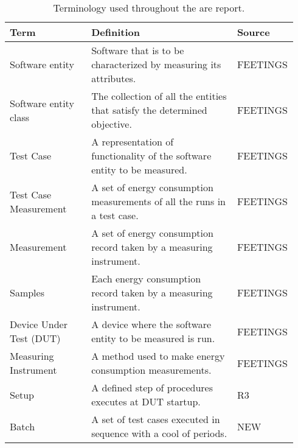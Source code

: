 
\begin{table}[ht]
    \begin{tabular}{| p{0.29\linewidth} | p{0.5\linewidth}| p{0.15\linewidth}|}
        \hline
        \textbf{Term}           & \textbf{Definition}                                                       & \textbf{Source} \\ \hline
        Software entity         & Software that is to be characterized by measuring its attributes.         & FEETINGS\cite{MANCEBO2021100558}        \\ \hline
        Software entity class   & The collection of all the entities that satisfy the determined objective. & FEETINGS        \\ \hline
        Test Case               & A representation of functionality of the software entity to be measured.  & FEETINGS        \\ \hline
        Test Case Measurement    & A set of energy consumption measurements of all the runs in a test case.  & FEETINGS        \\ \hline
        Measurement             & A set of energy consumption record taken by a measuring instrument.       & FEETINGS        \\ \hline
        Samples                 & Each energy consumption record taken by a measuring instrument.           & FEETINGS        \\ \hline
        Device Under Test (DUT) & A device where the software entity to be measured is run.                 & FEETINGS        \\ \hline
        Measuring Instrument    & A method used to make energy consumption measurements.                    & FEETINGS        \\ \hline
        Setup                   & A defined step of procedures executes at DUT startup.                     & R3\cite{Bokhari2020r3}              \\ \hline
        Batch                   & A set of test cases executed in sequence with a cool of periods.            & NEW             \\ \hline
    
    \end{tabular}
    \caption{Terminology used throughout the are report.}
    \label{tab:feetTable}
    \end{table}